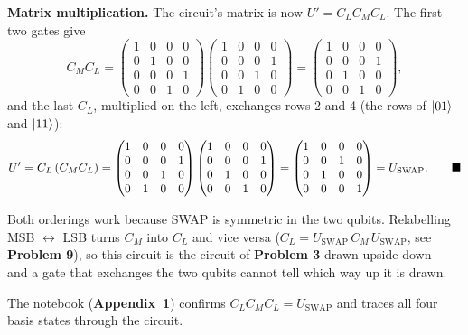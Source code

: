 \documentclass[a4paper, 10pt]{article}
\begin{document}
\begin{solution}
	\noindent \textbf{Matrix multiplication.} The circuit's matrix is now \( U' = C_L C_M C_L \). The first two gates give
	\[
		C_M C_L
		= \begin{pmatrix}
			1 & 0 & 0 & 0 \\ 0 & 1 & 0 & 0 \\ 0 & 0 & 0 & 1 \\ 0 & 0 & 1 & 0
		\end{pmatrix}
		\begin{pmatrix}
			1 & 0 & 0 & 0 \\ 0 & 0 & 0 & 1 \\ 0 & 0 & 1 & 0 \\ 0 & 1 & 0 & 0
		\end{pmatrix}
		= \begin{pmatrix}
			1 & 0 & 0 & 0 \\ 0 & 0 & 0 & 1 \\ 0 & 1 & 0 & 0 \\ 0 & 0 & 1 & 0
		\end{pmatrix},
	\]
	and the last \( C_L \), multiplied on the left, exchanges rows 2 and 4 (the rows of \( \ket{01} \) and \( \ket{11} \)):
	\[
		U' = C_L\left(C_M C_L\right)
		= \begin{pmatrix}
			1 & 0 & 0 & 0 \\ 0 & 0 & 0 & 1 \\ 0 & 0 & 1 & 0 \\ 0 & 1 & 0 & 0
		\end{pmatrix}
		\begin{pmatrix}
			1 & 0 & 0 & 0 \\ 0 & 0 & 0 & 1 \\ 0 & 1 & 0 & 0 \\ 0 & 0 & 1 & 0
		\end{pmatrix}
		= \begin{pmatrix}
			1 & 0 & 0 & 0 \\ 0 & 0 & 1 & 0 \\ 0 & 1 & 0 & 0 \\ 0 & 0 & 0 & 1
		\end{pmatrix}
		= U_{\text{SWAP}} . \qquad \blacksquare
	\]

	\begin{remark}
		Both orderings work because SWAP is symmetric in the two qubits.
		Relabelling MSB \( \leftrightarrow \) LSB turns \( C_M \) into \( C_L \) and vice versa (\( C_L = U_{\text{SWAP}}\, C_M \,U_{\text{SWAP}} \), see \textbf{Problem 9}), so this circuit is the circuit of \textbf{Problem 3} drawn upside down -- and a gate that exchanges the two qubits cannot tell which way up it is drawn.
	\end{remark}
	The notebook (\textbf{Appendix~1}) confirms \( C_L C_M C_L = U_{\text{SWAP}} \) and traces all four basis states through the circuit.
\end{solution}
\end{document}

